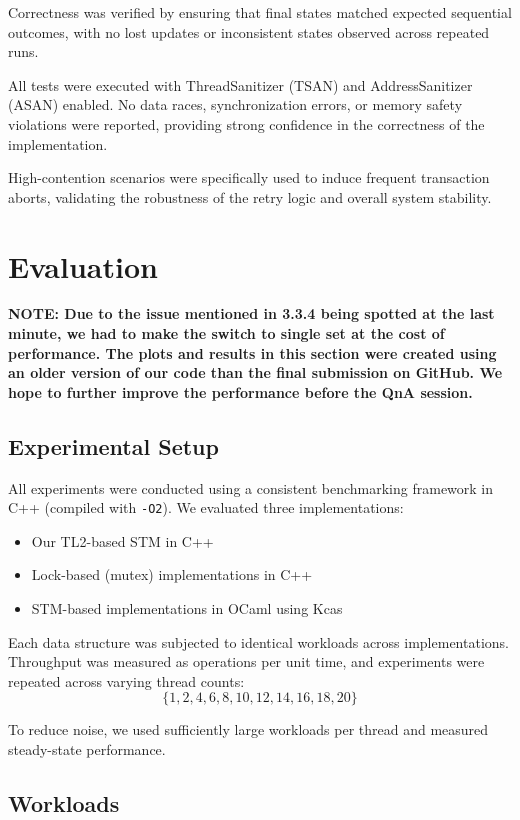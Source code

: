 \documentclass[11pt,a4paper]{article}
\begin{document}
Correctness was verified by ensuring that final states matched expected sequential outcomes, with no lost updates or inconsistent states observed across repeated runs.

All tests were executed with ThreadSanitizer (TSAN) and AddressSanitizer (ASAN) enabled. No data races, synchronization errors, or memory safety violations were reported, providing strong confidence in the correctness of the implementation.

High-contention scenarios were specifically used to induce frequent transaction aborts, validating the robustness of the retry logic and overall system stability.
\section{Evaluation}

\textbf{NOTE: Due to the issue mentioned in 3.3.4 being spotted at the last minute, we had to make the switch to single set at the cost of performance. The plots and results in this section were created using an older version of our code than the final submission on GitHub. We hope to further improve the performance before the QnA session.}

\subsection{Experimental Setup}

All experiments were conducted using a consistent benchmarking framework in C++ (compiled with \texttt{-O2}). We evaluated three implementations:
\begin{itemize}
    \item Our TL2-based STM in C++
    \item Lock-based (mutex) implementations in C++
    \item STM-based implementations in OCaml using Kcas
\end{itemize}

Each data structure was subjected to identical workloads across implementations. Throughput was measured as operations per unit time, and experiments were repeated across varying thread counts:
\[
\{1, 2, 4, 6, 8, 10, 12, 14, 16, 18, 20\}
\]

To reduce noise, we used sufficiently large workloads per thread and measured steady-state performance.

\subsection{Workloads}
\end{document}
